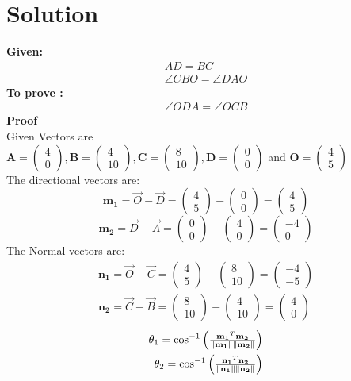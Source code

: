 \documentclass[10pt,a4paper]{article}
\newcommand{\myvec}[1]{\ensuremath{\begin{pmatrix}#1\end{pmatrix}}}
\let\vec\mathbf
\begin{document}
\section{Solution}
\textbf{Given:}
\begin{align}
    AD=BC\\
    \angle{CBO}=\angle{DAO}
\end{align}
\textbf{To prove :}
\begin{align}
    \angle{ODA}=\angle{OCB}
\end{align}
\textbf{Proof}\\
Given Vectors are \\
$\vec{A}=\myvec{4\\0},\vec{B}=\myvec{4\\10},\vec{C}=\myvec{8\\10},\vec{D}=\myvec{0\\0}$ and $\vec{O}=\myvec{4\\5}$\\
The directional vectors are:
\begin{equation}
    \vec{m_1}=\Vec{O}-\Vec{D} = \myvec{4\\5}-\myvec{0\\0}=\myvec{4\\5}
    \label{eq:m1}
\end{equation}
\begin{equation}
    \vec{m_2}=\Vec{D}-\Vec{A} = \myvec{0\\0}-\myvec{4\\0}=\myvec{-4\\0}\label{eq:m2}
\end{equation}
The Normal vectors are:
\begin{align}
    \vec{n_1}=\Vec{O}-\Vec{C}=\myvec{4\\5}-\myvec{8\\10}=\myvec{-4\\-5}
    \label{eq:n1}\\
    \vec{n_2}=\Vec{C}-\Vec{B}=\myvec{8\\10}-\myvec{4\\10}=\myvec{4\\0}
    \label{eq:n2}
\end{align}
\begin{align}
	\theta_1 =\cos^{-1}\myvec{\frac{\vec{m_1}^T\vec{m_2}}{\norm{\vec{m_1}}\norm{\vec{m_2}}}}
    \label{eq:theta1}\\
	\theta_2 =\cos^{-1}\myvec{\frac{\vec{n_1}^T\vec{n_2}}{\norm{\vec{n_1}}\norm{\vec{n_2}}}}
 \label{eq:theta2}
\end{align}
\end{document}

